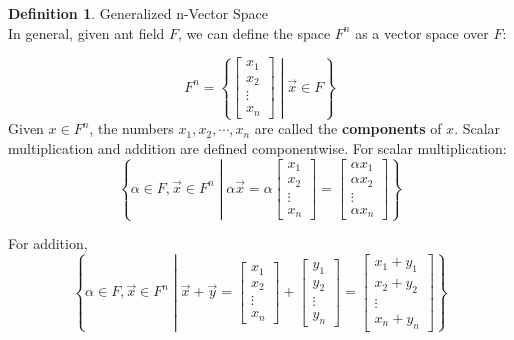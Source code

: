 \documentclass{book}
\theoremstyle{definition}
\newtheorem{definition}{Definition}[section]
\theoremstyle{remark}
\begin{document}
\newpage
\begin{definition}
Generalized n-Vector Space \\

    In general, given ant field $F$, we can define the space $F^n$ as a vector space over $F$:
    
        \begin{equation*}
            F^n = \left \{ \begin{bmatrix} x_1 \\ x_2 \\ \vdots \\ x_n \end{bmatrix} \middle | \vec{x} \in F \right \}
        \end{equation*}
    Given $x \in F^n$, the numbers $x_1, x_2, \cdots, x_n$ are called the \textbf{components} of $x$. Scalar multiplication and addition are defined componentwise. 
    For scalar multiplication: 
        \begin{equation*}
            \left \{ \alpha \in F, \vec{x} \in F^n \middle | \alpha \vec{x} = \alpha \begin{bmatrix} x_1 \\ x_2 \\ \vdots \\ x_n \end{bmatrix} = \begin{bmatrix} \alpha x_1 \\ \alpha x_2 \\ \vdots \\ \alpha x_n \end{bmatrix}  \right \}
        \end{equation*}
    
    For addition, 
        \begin{equation*}
            \left \{ \alpha \in F, \vec{x} \in F^n \middle | \vec{x} + \vec{y} = \begin{bmatrix} x_1 \\ x_2 \\ \vdots \\ x_n \end{bmatrix} + \begin{bmatrix} y_1 \\ y_2 \\ \vdots \\ y_n \end{bmatrix} = \begin{bmatrix} x_1 + y_1 \\ x_2 + y_2 \\ \vdots \\ x_n + y_n \end{bmatrix} \right \}
        \end{equation*}
    

\end{definition}
\end{document}
